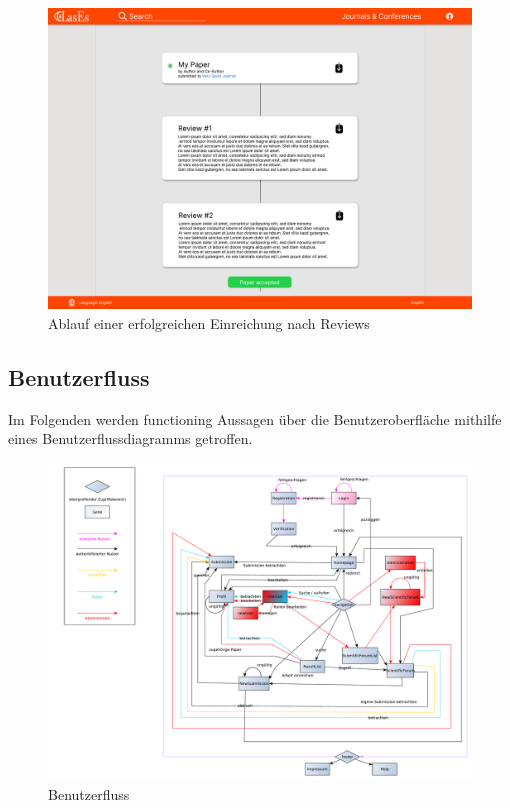 \begin{figure}[H]
	\centering
	\includegraphics[width=0.85\linewidth]{graphics/Paper_png}
	\caption{Ablauf einer erfolgreichen Einreichung nach Reviews}
	\label{fig:paperMockup}
\end{figure}


\subsection{Benutzerfluss}
Im Folgenden werden functioning Aussagen über die Benutzeroberfläche mithilfe eines Benutzerflussdiagramms getroffen.

\begin{figure}[H]
    \centering
    \includegraphics[width=\linewidth]{graphics/benutzerFlussyEd}
    \caption{Benutzerfluss}
	\label{fig:benutzerfluss}
\end{figure}


